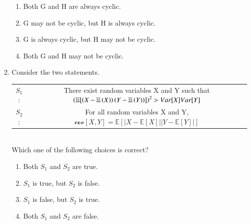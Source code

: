 \documentclass[a4paper, 11pt]{article}
\begin{document}
\begin{enumerate}
    \hfill{}
    \begin{enumerate}
        \item Both G and H are always cyclic.
        \item G may not be cyclic, but H is always cyclic.
        \item G is always cyclic, but H may not be cyclic.
        \item Both G and H may not be cyclic.
    \end{enumerate}
    
    \item Consider the two statements.\\
    \begin{tabular}{cc}
    \centering
        $S_1$: & There exist random variables X and Y such that $\left(\mathbb{E}[\left(X-\mathbb{E}\left(X\right)\right)\left(Y-\mathbb{E}\left(Y\right)\right)]\right)^2 > Var[X]Var[Y]$ \\
        $S_2$: & For all random variables X and Y,$\mathcal{cov}[X,Y] = \mathbb{E}[|X-\mathbb{E}[X]||Y-\mathbb{E}[Y]|]$
    \end{tabular}\\
    Which one of the following choices is correct?
    \begin{enumerate}
        \item Both $S_1$ and $S_2$ are true.
        \item $S_1$ is true, but $S_2$ is false.
        \item $S_1$ is false, but $S_2$ is true.
        \item Both $S_1$ and $S_2$ are false.
    \end{enumerate}
    \hfill{}
    

\end{enumerate}
\end{document}
